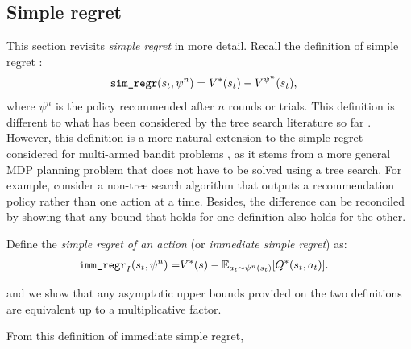 
\subsection{Simple regret} \label{app:simple_regret_results}


    This section revisits \textit{simple regret} in more detail. Recall the definition of simple regret :
    \begin{align} 
        {\textnormal{\texttt{sim\_regr}}}(s_t,\psi^n) &= V^*(s_t) - V^{\psi^n}(s_t), 
    \end{align}
    where $\psi^n$ is the policy recommended after $n$ rounds or trials. This definition is different to what has been considered by the tree search literature so far . However, this definition is a more natural extension to the simple regret considered for multi-armed bandit problems , as it stems from a more general MDP planning problem that does not have to be solved using a tree search. For example, consider a non-tree search algorithm that outputs a recommendation policy rather than one action at a time. Besides, the difference can be reconciled by showing that any bound that holds for one definition also holds for the other. 
    
    Define the \textit{simple regret of an action} (or \textit{immediate simple regret}) as:
    \begin{align}
        {\textnormal{\texttt{imm\_regr}}}_I(s_t,\psi^n) =& V^*(s) - \mathbb{E}_{a_t\sim\psi^n(s_t)}[Q^*(s_t,a_t)].
    \end{align}
    
    and we show that any asymptotic upper bounds provided on the two definitions are equivalent up to a multiplicative factor. 






    From this definition of immediate simple regret, 

